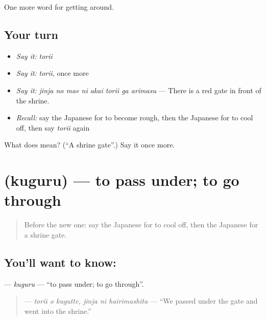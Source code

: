 \begin{grammarlens}[title={What you've built}]
One more word for getting around.
\end{grammarlens}

\subsection*{Your turn}
\begin{itemize}
\raggedright
  \item \emph{Say it:} \emph{torii}
  \item \emph{Say it:} \emph{torii}, once more
  \item \emph{Say it:} \emph{jinja no mae ni akai torii ga arimasu} — There is a red gate in front of the shrine.
  \item \emph{Recall:} say the Japanese for to become rough, then the Japanese for to cool off, then say \emph{torii} again
\end{itemize}

\begin{tcolorbox}[breakable,colback=teal!4,colframe=teal!35!black,title={Before you move on}]
What does  mean? (\textquotedblleft{}A shrine gate\textquotedblright{}.) Say it once more.
\end{tcolorbox}
\section[\texorpdfstring{\ja{くぐる} (kuguru)}{くぐる (kuguru)}]{ (kuguru) — to pass under; to go through}

\label{lesson:JA-C406-kuguru}



\begin{quote}
Before the new one: say the Japanese for to cool off, then the Japanese for a shrine gate.
\end{quote}

\subsection*{You'll want to know: }
\textbf{} — \emph{kuguru} — \textquotedblleft{}to pass under; to go through\textquotedblright{}.

\begin{quote}
\textbf{  } — \emph{torii o kugutte, jinja ni hairimashita} — \textquotedblleft{}We passed under the gate and went into the shrine.\textquotedblright{}
\end{quote}

